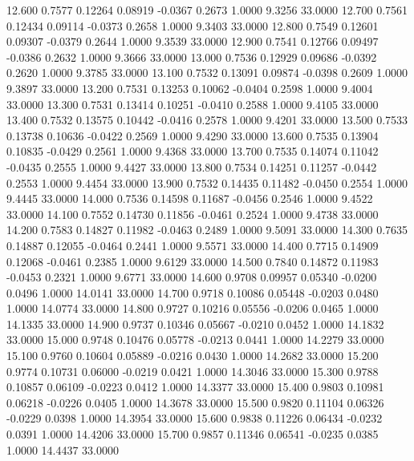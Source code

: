   12.600   0.7577   0.12264   0.08919  -0.0367   0.2673   1.0000   9.3256  33.0000
  12.700   0.7561   0.12434   0.09114  -0.0373   0.2658   1.0000   9.3403  33.0000
  12.800   0.7549   0.12601   0.09307  -0.0379   0.2644   1.0000   9.3539  33.0000
  12.900   0.7541   0.12766   0.09497  -0.0386   0.2632   1.0000   9.3666  33.0000
  13.000   0.7536   0.12929   0.09686  -0.0392   0.2620   1.0000   9.3785  33.0000
  13.100   0.7532   0.13091   0.09874  -0.0398   0.2609   1.0000   9.3897  33.0000
  13.200   0.7531   0.13253   0.10062  -0.0404   0.2598   1.0000   9.4004  33.0000
  13.300   0.7531   0.13414   0.10251  -0.0410   0.2588   1.0000   9.4105  33.0000
  13.400   0.7532   0.13575   0.10442  -0.0416   0.2578   1.0000   9.4201  33.0000
  13.500   0.7533   0.13738   0.10636  -0.0422   0.2569   1.0000   9.4290  33.0000
  13.600   0.7535   0.13904   0.10835  -0.0429   0.2561   1.0000   9.4368  33.0000
  13.700   0.7535   0.14074   0.11042  -0.0435   0.2555   1.0000   9.4427  33.0000
  13.800   0.7534   0.14251   0.11257  -0.0442   0.2553   1.0000   9.4454  33.0000
  13.900   0.7532   0.14435   0.11482  -0.0450   0.2554   1.0000   9.4445  33.0000
  14.000   0.7536   0.14598   0.11687  -0.0456   0.2546   1.0000   9.4522  33.0000
  14.100   0.7552   0.14730   0.11856  -0.0461   0.2524   1.0000   9.4738  33.0000
  14.200   0.7583   0.14827   0.11982  -0.0463   0.2489   1.0000   9.5091  33.0000
  14.300   0.7635   0.14887   0.12055  -0.0464   0.2441   1.0000   9.5571  33.0000
  14.400   0.7715   0.14909   0.12068  -0.0461   0.2385   1.0000   9.6129  33.0000
  14.500   0.7840   0.14872   0.11983  -0.0453   0.2321   1.0000   9.6771  33.0000
  14.600   0.9708   0.09957   0.05340  -0.0200   0.0496   1.0000  14.0141  33.0000
  14.700   0.9718   0.10086   0.05448  -0.0203   0.0480   1.0000  14.0774  33.0000
  14.800   0.9727   0.10216   0.05556  -0.0206   0.0465   1.0000  14.1335  33.0000
  14.900   0.9737   0.10346   0.05667  -0.0210   0.0452   1.0000  14.1832  33.0000
  15.000   0.9748   0.10476   0.05778  -0.0213   0.0441   1.0000  14.2279  33.0000
  15.100   0.9760   0.10604   0.05889  -0.0216   0.0430   1.0000  14.2682  33.0000
  15.200   0.9774   0.10731   0.06000  -0.0219   0.0421   1.0000  14.3046  33.0000
  15.300   0.9788   0.10857   0.06109  -0.0223   0.0412   1.0000  14.3377  33.0000
  15.400   0.9803   0.10981   0.06218  -0.0226   0.0405   1.0000  14.3678  33.0000
  15.500   0.9820   0.11104   0.06326  -0.0229   0.0398   1.0000  14.3954  33.0000
  15.600   0.9838   0.11226   0.06434  -0.0232   0.0391   1.0000  14.4206  33.0000
  15.700   0.9857   0.11346   0.06541  -0.0235   0.0385   1.0000  14.4437  33.0000
